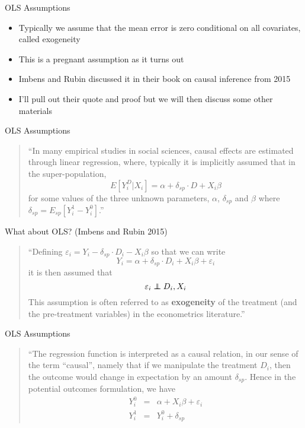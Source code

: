 \documentclass{beamer}
\newcommand\independent{\protect\mathpalette{\protect\independenT}{\perp}}
\def\independenT#1#2{\mathrel{\rlap{$#1#2$}\mkern2mu{#1#2}}}
\begin{document}
\begin{frame}{OLS Assumptions}

\begin{itemize}

\item Typically we assume that the mean error is zero conditional on all covariates, called exogeneity
\item This is a pregnant assumption as it turns out
\item Imbens and Rubin discussed it in their book on causal inference from 2015
\item I'll pull out their quote and proof but we will then discuss some other materials

\end{itemize}

\end{frame}


\begin{frame}{OLS Assumptions}

	\begin{quote} 
	``In many empirical studies in social sciences, causal effects are estimated through linear regression, where, typically it is implicitly assumed that in the super-population, $$E[Y_i^D | X_i] = \alpha + \delta_{sp} \cdot D + X_i \beta$$ for some values of the three unknown parameters, $\alpha$, $\delta_{sp}$ and $\beta$ where $\delta_{sp} = E_{sp} [ Y_i^1 - Y_i^0]$.''
	\end{quote}
	
\end{frame}

\begin{frame}{What about OLS?  (Imbens and Rubin 2015)}

\begin{quote}
``Defining $\varepsilon_i = Y_i - \delta_{sp} \cdot D_i - X_i \beta$ so that we can write $$Y_i = \alpha + \delta_{sp} \cdot D_i + X_i \beta  + \varepsilon_i$$ it is then assumed that $$\varepsilon_i \independent D_i, X_i$$This assumption is often referred to as \textbf{exogeneity} of the treatment (and the pre-treatment variables) in the econometrics literature.''

\end{quote}

\end{frame}

\begin{frame}{OLS Assumptions}

\begin{quote}
``The regression function is interpreted as a causal relation, in our sense of the term ``causal'', namely that if we manipulate the treatment $D_i$, then the outcome would change in expectation by an amount $\delta_{sp}$.  Hence in the potential outcomes formulation, we have 
\begin{eqnarray*}
Y_i^0 &=& \alpha + X_i \beta + \varepsilon_i \\ 
Y_i^1 &=& Y_i^0 + \delta_{sp}
\end{eqnarray*} 

\end{quote}
	
\end{frame}
\end{document}
